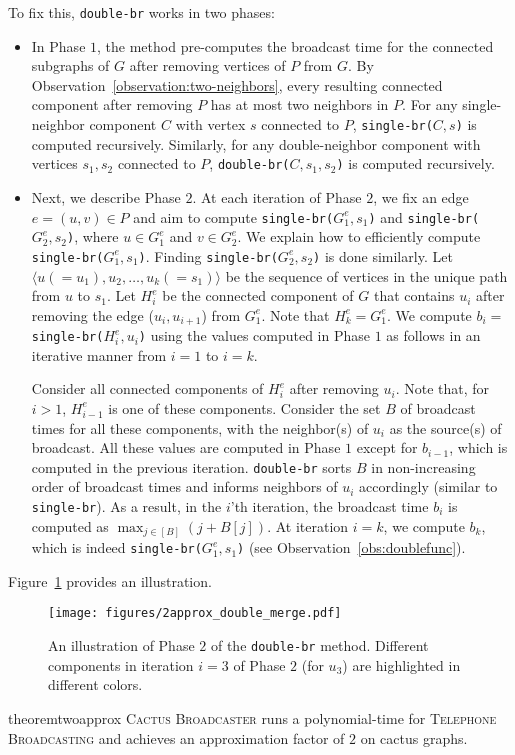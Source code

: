 \documentclass[letterpaper,11pt]{article}
\newcommand{\telebr}{\textsc{Telephone Broadcasting}\xspace}
\newcommand{\singlefunc}[1]{\texttt{single-br(#1)}\xspace}
\newcommand{\doublefunc}[1]{\texttt{double-br(#1)}\xspace}
\newcommand{\singlefuncc}{\texttt{single-br}\xspace}
\newcommand{\doublefuncc}{\texttt{double-br}\xspace}
\newcommand{\ouralgo}{\textsc{Cactus Broadcaster}\xspace}
\newcommand{\twoapproxnewfig}{

\begin{figure}
	\centering
	\texttt{[image: figures/2approx\_double\_merge.pdf]}
	\caption{An illustration of Phase $2$ of the \doublefuncc method. Different components in iteration $i=3$ of Phase $2$ (for $u_3$) are highlighted in different colors. 
}
    \label{fig:2approxDoubleMerge}
\end{figure}
}
\begin{document}
To fix this, 
\doublefuncc works in two phases:
\begin{itemize}
    \item In {Phase} ${1}$, the method pre-computes the broadcast time for the connected subgraphs of $G$ after removing vertices of $P$ from $G$. By Observation~\ref{observation:two-neighbors}, 
every resulting connected component after removing $P$ has at most two neighbors in $P$. For any single-neighbor component $C$ with vertex $s$ connected to $P$, \singlefunc{$C,s$} is computed recursively. Similarly, for any double-neighbor component with vertices $s_1, s_2$ connected to $P$,  \doublefunc{$C,s_1,s_2$} is computed recursively. 


\item Next, we describe {Phase} ${2}$. At each iteration of Phase $2$, we fix an edge $e=(u,v) \in P$ and aim to compute \singlefunc{$G_1^e,s_1$} and \singlefunc{$G_2^e,s_2$}, where $u\in G_1^e$ and $v\in G_2^e$. 
We explain how to efficiently compute \singlefunc{$G_1^e,s_1$}. Finding \singlefunc{$G_2^e,s_2$} is done similarly. 
Let $\langle u(=u_1), u_2, \ldots, u_k(=s_1)\rangle$ be the sequence of vertices in the unique path from $u$ to $s_1$.
Let $H^e_{i}$ be the connected component of $G$ that contains $u_i$ after removing the edge ($u_i, u_{i+1}$) from $G_1^e$. 
Note that $H^e_k = G_1^e$. 
We compute $b_i=$\singlefunc{$H^e_i, u_i$} using the values computed in Phase $1$ as follows in an iterative manner from $i=1$ to $i=k$. 

Consider all connected components of $H^e_i$ after removing $u_i$. Note that, for $i>1$, $H^e_{i-1}$ is one of these components. 
Consider the set $B$ of broadcast times for all these components, 
with the neighbor(s) of $u_i$ as the source(s) of broadcast. All these values are computed in Phase $1$ except for $b_{i-1}$, which is computed in the previous iteration. \doublefuncc sorts $B$ in non-increasing order of broadcast times and informs neighbors of $u_i$ accordingly (similar to \singlefuncc). As a result, in the $i$'th iteration, the broadcast time $b_i$ is computed as $\max_{j \in [B]} (j+B[j]) $. At iteration $i=k$, 
we compute $b_k$, which is indeed \singlefunc{$G^e_1, s_1$} (see Observation~\ref{obs:doublefunc}).
\end{itemize}
Figure~\ref{fig:2approxDoubleMerge} provides an illustration. 


\twoapproxnewfig



\begin{restatable}{theorem}{twoapprox} \label{thm:2approx}
    \ouralgo runs a polynomial-time for \telebr and achieves an approximation factor of $2$ on cactus graphs.
\end{restatable}
\end{document}

